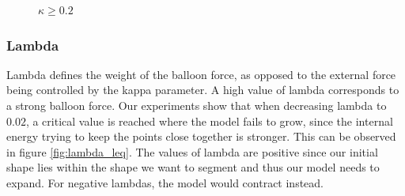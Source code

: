 \begin{figure}[!hbt]
\centering   
{}
\caption{$\kappa \geq 0.2$}
\label{fig:kappa_geq}
\end{figure}

\subsubsection{Lambda}

Lambda defines the weight of the balloon force, as opposed to the external force being controlled by the kappa parameter. A high value of lambda corresponds to a strong balloon force. Our experiments show that when decreasing lambda to $0.02$, a critical value is reached where the model fails to grow, since the internal energy trying to keep the points close together is stronger. This can be observed in figure \ref{fig:lambda_leq}. The values of lambda are positive since our initial shape lies within the shape we want to segment and thus our model needs to expand. For negative lambdas, the model would contract instead.

